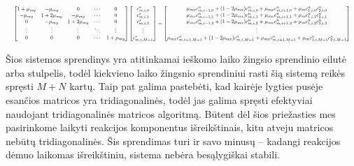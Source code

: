 \begin{align*}
  \resizebox{\textwidth}{!}{$
  \begin{bmatrix}
    1 + \mu_{my} & -\mu_{my} & 0 & \cdots & 0\\
    -\mu_{my} & 1 + 2\mu_{my} & -\mu_{my} & \cdots & 0\\
    0 & -\mu_{my} & 1 + 2\mu_{my} & \cdots & 0\\
    \vdots & \vdots & \vdots & \ddots & \vdots\\
    0 & 0 & 0 & \cdots & 1 + \mu_{my}
  \end{bmatrix}
  \begin{bmatrix}
    c^*_{m,i,0}\\
    c^*_{m,i,1}\\
    c^*_{m,i,2}\\
    \vdots\\
    c^*_{m,i,M-1}
  \end{bmatrix}
  =
  \begin{bmatrix}
    \mu_{mx}c^n_{m,i-1,0}+(1-2\mu_{mx})c^n_{m,i,0}+\mu_{mx}c^n_{m,i+1,0}+\mu_m c^n_{1,i,0}c^n_{2,i,0}\\
    \mu_{mx}c^n_{m,i-1,1}+(1-2\mu_{mx})c^n_{m,i,1}+\mu_{mx}c^n_{m,i+1,1}+\mu_m c^n_{1,i,1}c^n_{2,i,1}\\
    \mu_{mx}c^n_{m,i-1,2}+(1-2\mu_{mx})c^n_{m,i,2}+\mu_{mx}c^n_{m,i+1,2}+\mu_m c^n_{1,i,2}c^n_{2,i,2}\\
    \vdots\\
    \mu_{mx}c^n_{m,i-1,M-1}+(1-2\mu_{mx})c^n_{m,i,M-1}+\mu_{mx}c^n_{m,i+1,M-1}+\mu_m c^n_{1,i,M-1}c^n_{2,i,M-1}
  \end{bmatrix}
  $}
\end{align*}

Šios sistemos sprendinys yra atitinkamai ieškomo laiko žingsio sprendinio eilutė arba stulpelis, todėl kiekvieno laiko žingsnio sprendiniui rasti šią sistemą reikės spręsti $M + N$ kartų. Taip pat galima pastebėti, kad kairėje lygties pusėje esančios matricos yra tridiagonalinės, todėl jas galima spręsti efektyviai naudojant tridiagonalinės matricos algoritmą. Būtent dėl šios priežasties mes pasirinkome laikyti reakcijos komponentus išreikštinais, kitu atveju matricos nebūtų tridiagonalinės. Šis sprendimas turi ir savo minusų -- kadangi reakcijos dėmuo laikomas išreikštiniu, sistema nebėra besąlygiškai stabili.